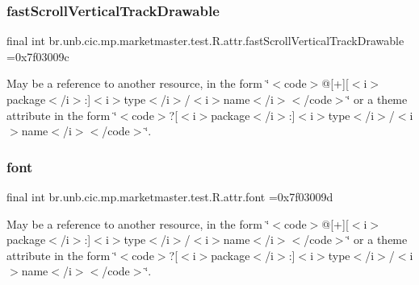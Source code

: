 \subsubsection{\texorpdfstring{fast\+Scroll\+Vertical\+Track\+Drawable}{fastScrollVerticalTrackDrawable}}
{\footnotesize\ttfamily final int br.\+unb.\+cic.\+mp.\+marketmaster.\+test.\+R.\+attr.\+fast\+Scroll\+Vertical\+Track\+Drawable =0x7f03009c\hspace{0.3cm}{\ttfamily [static]}}

May be a reference to another resource, in the form \char`\"{}$<$code$>$@\mbox{[}+\mbox{]}\mbox{[}$<$i$>$package$<$/i$>$\+:\mbox{]}$<$i$>$type$<$/i$>$/$<$i$>$name$<$/i$>$$<$/code$>$\char`\"{} or a theme attribute in the form \char`\"{}$<$code$>$?\mbox{[}$<$i$>$package$<$/i$>$\+:\mbox{]}$<$i$>$type$<$/i$>$/$<$i$>$name$<$/i$>$$<$/code$>$\char`\"{}. \mbox{\label{classbr_1_1unb_1_1cic_1_1mp_1_1marketmaster_1_1test_1_1R_1_1attr_a9ebbe51a93e32122b6a8feceabdda7b8}} 
\subsubsection{\texorpdfstring{font}{font}}
{\footnotesize\ttfamily final int br.\+unb.\+cic.\+mp.\+marketmaster.\+test.\+R.\+attr.\+font =0x7f03009d\hspace{0.3cm}{\ttfamily [static]}}

May be a reference to another resource, in the form \char`\"{}$<$code$>$@\mbox{[}+\mbox{]}\mbox{[}$<$i$>$package$<$/i$>$\+:\mbox{]}$<$i$>$type$<$/i$>$/$<$i$>$name$<$/i$>$$<$/code$>$\char`\"{} or a theme attribute in the form \char`\"{}$<$code$>$?\mbox{[}$<$i$>$package$<$/i$>$\+:\mbox{]}$<$i$>$type$<$/i$>$/$<$i$>$name$<$/i$>$$<$/code$>$\char`\"{}. \mbox{\label{classbr_1_1unb_1_1cic_1_1mp_1_1marketmaster_1_1test_1_1R_1_1attr_ab158b56a4c6a5fdf1c6fc66ab06742cd}} 
